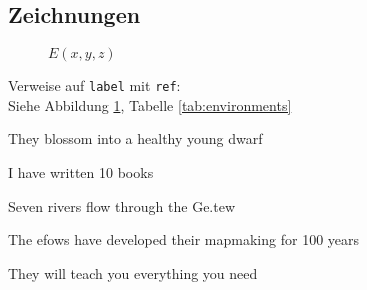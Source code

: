 \documentclass{article}
\begin{document}
\newcommand{\drawgrid}[4]{
	\draw[style={help lines, color=blue!50}] (#1, #2) grid (#3, #4);
	\draw (0, #2) -- (0, #4);
	\draw (#1, 0) -- (#3, 0);
}
\newcommand{\ellipseX}{cos(\x r)*1.5}
\newcommand{\ellipseY}{0.5+sin(\x r)*0.5}
\newcommand{\inverseX}[2]{((#1)/((#1)^2 + (#2)^2))}
\newcommand{\inverseY}[2]{((#2)/((#1)^2 + (#2)^2))}
\newcommand{\inverseellipseX}{\inverseX{\ellipseX}{\ellipseY}}
\newcommand{\inverseellipseY}{\inverseY{\ellipseX}{\ellipseY}}

\subsection{Zeichnungen}
\begin{figure}
	\caption{ $E(x, y, z)$ }
	\label{fig:ellipse}
\end{figure}

Verweise auf {\tt label} mit {\tt ref}: \\
Siehe Abbildung \ref{fig:ellipse},
	Tabelle \ref{tab:environments}


	{ }
	{They blossom into a healthy young dwarf}

	{  }
	{I have written 10 books}

	{    }
	{Seven rivers flow through the Ge\zh{}.t\sh{}ew}

	{    }
	{The \Sh{}ef\nh\gh{}ows have developed their mapmaking for 100 years}

	{  }
	{They will teach you everything you need}
\end{document}
